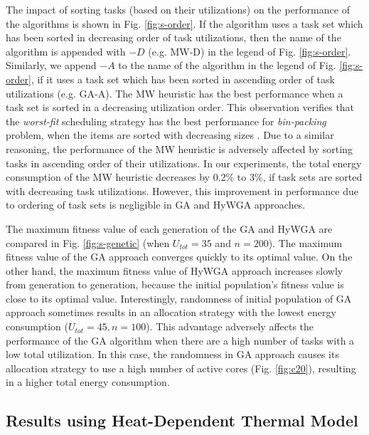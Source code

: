 \documentclass[conference]{IEEEtran}
\begin{document}
The impact of sorting tasks (based on their utilizations) on the performance of the algorithms is shown in Fig. \ref{fig:s-order}.
If the algorithm uses a task set which has been sorted in decreasing order of task utilizations, then the name of the algorithm is appended with $-D$ (e.g. MW-D)
in the legend of Fig. \ref{fig:s-order}.
Similarly, we append $-A$ to the name of the algorithm in the legend of Fig. \ref{fig:s-order}, if it uses a task set which has been
sorted in ascending order of task utilizations (e.g. GA-A).
The MW heuristic has the best performance when a task set is sorted in a decreasing utilization order.
This observation verifies that the \emph{worst-fit} scheduling strategy has the best performance for \emph{bin-packing} problem, when the
items are sorted with decreasing sizes \cite{Aydin03}. Due to a similar reasoning, the performance of the MW heuristic is adversely affected
by sorting tasks in ascending order of their utilizations.
In our experiments, the total energy consumption
of the MW heuristic decreases by 0.2\% to 3\%, if task sets are sorted with decreasing task utilizations.
However, this improvement in performance due to ordering of task sets is %
negligible
in GA and HyWGA approaches.


The maximum fitness value of each generation of the GA and HyWGA are compared in Fig. \ref{fig:s-genetic} (when $U_{tot}=35$ and $n=200$).
The maximum fitness value of the GA approach
converges quickly to its optimal value. On the other hand, the maximum fitness value of HyWGA approach increases %
slowly from generation to generation, because the initial population's fitness value is  close to its optimal value.
Interestingly, randomness of initial population of GA approach sometimes results in an allocation strategy with the lowest energy consumption ($U_{tot}=45, n=100$).
This advantage adversely affects the performance of the GA algorithm when there are a high number of tasks with a low total utilization.
In this case, the randomness in GA approach causes its allocation strategy to use a high number of active cores (Fig. \ref{fig:c20}),
resulting in a higher total energy consumption. %


\subsection{Results using Heat-Dependent Thermal Model}
\end{document}
